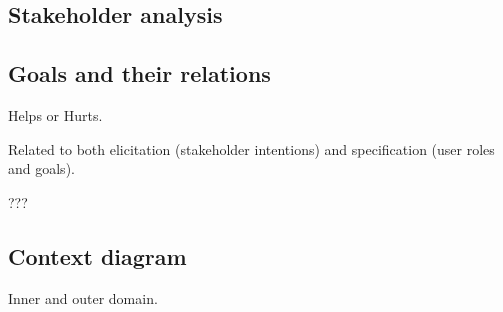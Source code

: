 \subsection{Stakeholder analysis}

\subsection{Goals and their relations}

Helps or Hurts.

Related to both elicitation (stakeholder intentions) and specification (user roles and goals).

???

\subsection{Context diagram}

Inner and outer domain.






